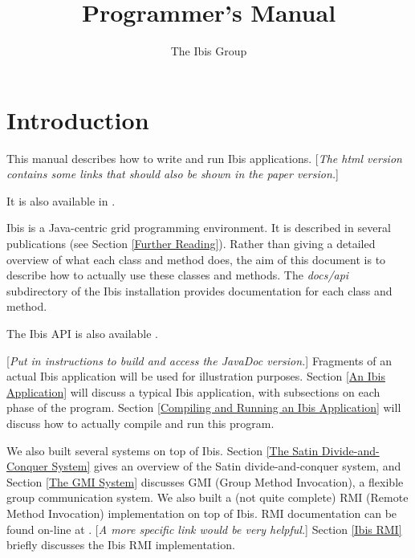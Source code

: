 \documentclass[10pt]{article}
\newcommand{\remark}[1]{[\emph{#1}]}
\begin{document}
\title{
{}
{}
Programmer's Manual}

\author{The Ibis Group}

\maketitle

\section{Introduction}

This manual describes how to write and run Ibis applications.
\remark{The html version contains some links that should also
be shown in the paper version.}
\begin{htmlonly}
It is also available in
.
\end{htmlonly}
Ibis is a Java-centric grid programming environment.
It is described in several publications (see Section \ref{Further Reading}).
Rather than giving a detailed overview of what each class and method does,
the aim of this document is to describe how to actually use these classes
and methods.
The \emph{docs/api} subdirectory of the Ibis installation provides
documentation for each class and method.
\begin{htmlonly}
The Ibis API is also available
.
\end{htmlonly}
\remark{Put in instructions to build and access the JavaDoc version.}
Fragments of an actual Ibis application will be used for illustration purposes.
Section \ref{An Ibis Application} will discuss a typical Ibis application,
with subsections on each phase of the program.
Section \ref{Compiling and Running an Ibis Application} will discuss how to
actually compile and run this program.

We also built several systems on top of Ibis.
Section \ref{The Satin Divide-and-Conquer System}
gives an overview of the Satin divide-and-conquer
system, and Section \ref{The GMI System} discusses GMI
(Group Method Invocation),
a flexible group communication system.
We also built a (not quite complete) RMI (Remote Method Invocation)
implementation on top of Ibis. RMI documentation can be found on-line at
{}
{}.
\remark{A more specific link would be very helpful.}
Section \ref{Ibis RMI} briefly discusses the Ibis RMI implementation.
\end{document}
